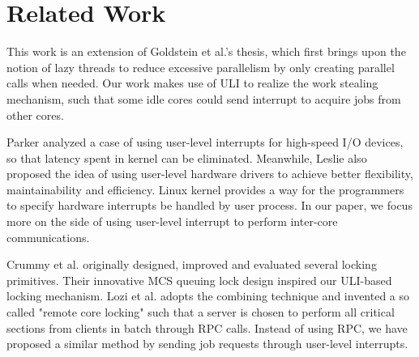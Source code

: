 \section{Related Work}

This work is an extension of Goldstein et al.'s \cite{goldstein} thesis, which first brings upon the notion of lazy threads to reduce excessive parallelism by only creating parallel calls when needed. Our work makes use of ULI to realize the work stealing mechanism, such that some idle cores could send interrupt to acquire jobs from other cores.

Parker \cite{parker} analyzed a case of using user-level interrupts for high-speed I/O devices, so that latency spent in kernel can be eliminated. Meanwhile, Leslie \cite{leslie} also proposed the idea of using user-level hardware drivers to achieve better flexibility, maintainability and efficiency.  Linux kernel provides a way for the programmers to specify hardware interrupts be handled by user process. In our paper, we focus more on the side of using user-level interrupt to perform inter-core communications.

Crummy et al. \cite{mellor1991synchronization} originally designed, improved and evaluated several locking primitives. Their innovative MCS queuing lock design inspired our ULI-based locking mechanism. Lozi et al. \cite{lozi} adopts the combining technique and invented a so called "remote core locking" such that a server is chosen to perform all critical sections from clients in batch through RPC calls. Instead of using RPC, we have proposed a similar method by sending job requests through user-level interrupts.


